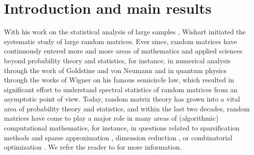 \documentclass[a4paper]{amsart}
\theoremstyle{definition}
\theoremstyle{remark}
\numberwithin{equation}{section}
\begin{document}

\maketitle

\vspace{-4pt}
\tableofcontents



%
\section{Introduction and main results}
%



With his work on the statistical analysis of large samples \cite{W1928}, Wishart initiated the systematic study of large random matrices. Ever since, random matrices have continuously entered more and more areas of mathematics and applied sciences beyond probability theory and statistics, for instance, in numerical analysis through the work of Goldstine and von Neumann \cite{vN,GvN1951} and in quantum physics through the works of Wigner \cite{W1955,W1957,W1958} on his famous semicircle law, which resulted in significant effort to understand spectral statistics of random matrices from an asymptotic point of view. Today, random matrix theory has grown into a vital area of probability theory and statistics, and within the last two decades, random matrices have come to play a major role in many areas of (algorithmic) computational mathematics, for instance, in questions related to sparsification methods \cite{AM2007,ST2004} and sparse approximation \cite{Tr2008_b,Tr2008}, dimension reduction \cite{AC2009,BDN2015,LLR1995}, or combinatorial optimization \cite{NRV2014,So2011}. We refer the reader to \cite{ABDF2015, AGZ2010, T2015} for more information.
\end{document}

